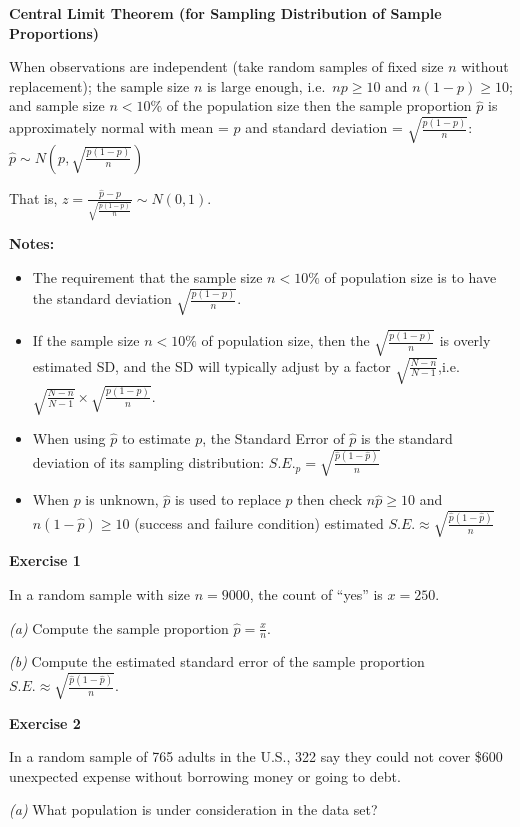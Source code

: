 \documentclass[
]{book}
\begin{document}
\textbf{Central Limit Theorem (for Sampling Distribution of Sample Proportions)}

When observations are independent (take random samples of fixed size \(n\) without replacement); the sample size \(n\) is large enough, i.e.~\(np \geq 10\) and \(n(1-p) \geq 10\); and sample size \(n < 10\%\) of the population size then the sample proportion \(\hat{p}\) is approximately normal with mean = \(p\) and standard deviation = \(\sqrt{\frac{p(1-p)}{n}}\): \(\hat{p} \sim N(p, \sqrt{\frac{p(1-p)}{n}})\)

That is, \(z = \frac{\hat{p} - p}{\sqrt{\frac{p(1-p)}{n}}} \sim N(0, 1)\).

\textbf{Notes:}

\begin{itemize}
\item
  The requirement that the sample size \(n < 10\%\) of population size is to have the standard deviation \(\sqrt{\frac{p(1-p)}{n}}\).
\item
  If the sample size \(n < 10\%\) of population size, then the \(\sqrt{\frac{p(1-p)}{n}}\) is overly estimated SD, and the SD will typically adjust by a factor \(\sqrt{\frac{N-n}{N-1}}\),i.e.~\(\sqrt{\frac{N-n}{N-1}} \times \sqrt{\frac{p(1-p)}{n}}\).
\item
  When using \(\hat{p}\) to estimate \(p\), the Standard Error of \(\hat{p}\) is the standard deviation of its sampling distribution: \(S.E._{\hat{p}} = \sqrt{\frac{\hat{p}(1-\hat{p})}{n}}\)
\item
  When \(p\) is unknown, \(\hat{p}\) is used to replace \(p\) then check \(n\hat{p} \geq 10\) and \(n(1-\hat{p}) \geq 10\) (success and failure condition) estimated \(S.E. \approx \sqrt{\frac{\hat{p}(1-\hat{p})}{n}}\)
\end{itemize}

\textbf{Exercise 1}

In a random sample with size \(n=9000\), the count of ``yes'' is \(x=250\).

\emph{(a)} Compute the sample proportion \(\hat{p} = \frac{x}{n}\).

\emph{(b)} Compute the estimated standard error of the sample proportion \(S.E. \approx \sqrt{\frac{\hat{p}(1-\hat{p})}{n}}\).

\textbf{Exercise 2}

In a random sample of 765 adults in the U.S., 322 say they could not cover \$600 unexpected expense without borrowing money or going to debt.

\emph{(a)} What population is under consideration in the data set?
\end{document}
